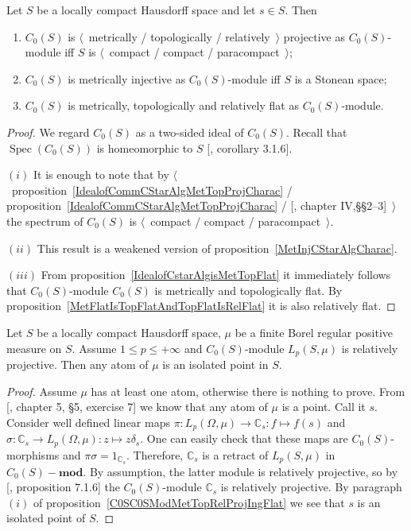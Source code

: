 \begin{proposition}\label{C0SC0SModMetTopRelProjIngFlat} Let $S$ be a locally
compact Hausdorff space and let $s\in S$. Then

\begin{enumerate}[label = (\roman*)]
    \item $C_0(S)$ is $\langle$~metrically / 
    topologically / relatively~$\rangle$
    projective as $C_0(S)$-module iff $S$ is $\langle$~compact / compact /
    paracompact~$\rangle$;

    \item $C_0(S)$ is metrically injective as $C_0(S)$-module iff $S$ is 
    a Stonean space;

    \item $C_0(S)$ is metrically, topologically and relatively flat as
    $C_0(S)$-module.
\end{enumerate}
\end{proposition}
\begin{proof} We regard $C_0(S)$ as a two-sided ideal of $C_0(S)$. Recall that
$\operatorname{Spec}(C_0(S))$ is homeomorphic to $S$ [\cite{HelHomolBanTopAlg},
corollary 3.1.6].

$(i)$ It is enough to note that by
$\langle$~proposition~\ref{IdealofCommCStarAlgMetTopProjCharac} /
proposition~\ref{IdealofCommCStarAlgMetTopProjCharac} /
[\cite{HelHomolBanTopAlg}, chapter IV,\S\S 2--3]~$\rangle$ the spectrum of
$C_0(S)$ is $\langle$~compact / compact / paracompact~$\rangle$. 

$(ii)$ This result is a weakened version of
proposition~\ref{MetInjCStarAlgCharac}.

$(iii)$ From proposition~\ref{IdealofCstarAlgisMetTopFlat} it immediately follows
that $C_0(S)$-module $C_0(S)$ is metrically and topologically flat. By
proposition~\ref{MetFlatIsTopFlatAndTopFlatIsRelFlat} it is also relatively
flat.
\end{proof}

\begin{proposition}\label{AtomsOfRelProjLpMod} Let $S$ be a locally compact
Hausdorff space, $\mu$ be a finite Borel regular positive measure on $S$. Assume
$1\leq p\leq+\infty$ and $C_0(S)$-module $L_p(S,\mu)$ is relatively projective.
Then any atom of $\mu$ is an isolated point in $S$.
\end{proposition} 
\begin{proof} Assume $\mu$ has at least one atom, otherwise there is nothing to
prove. From [\cite{BourbElemMathIntegLivVI}, chapter 5, \S 5, exercise 7] we
know that any atom of $\mu$ is a point. Call it $s$. Consider well defined
linear maps $\pi:L_p(\Omega,\mu)\to\mathbb{C}_s:f\mapsto f(s)$ and
$\sigma:\mathbb{C}_s\to L_p(\Omega,\mu):z\mapsto z\delta_s$. One can easily
check that these maps are $C_0(S)$-morphisms and $\pi\sigma=1_{\mathbb{C}_s}$.
Therefore, $\mathbb{C}_s$ is a retract of $L_p(S,\mu)$ in $C_0(S)-\mathbf{mod}$.
By assumption, the latter module is relatively projective, so by
[\cite{HelBanLocConvAlg}, proposition 7.1.6] the $C_0(S)$-module $\mathbb{C}_s$
is relatively projective. By paragraph $(i)$ of
proposition~\ref{C0SC0SModMetTopRelProjIngFlat} we see that $s$ is an isolated
point of $S$.
\end{proof}

